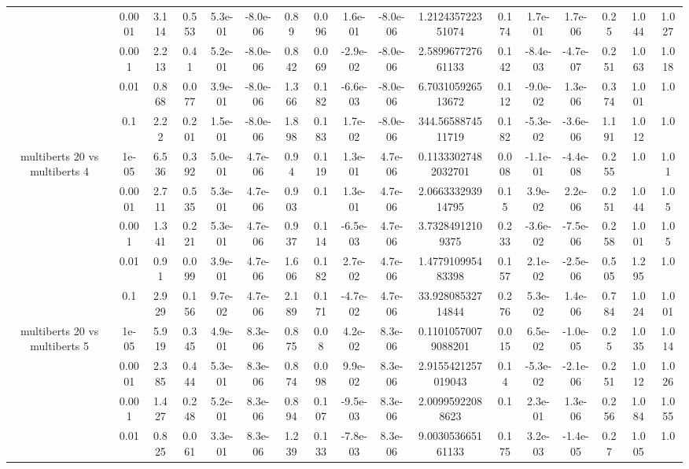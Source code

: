 \begin{tabular}{|c|c|c|c|c|c|c|c|c|c|c|c|c|c|c|c|c|}
 & 0.0001 & 3.114 & 0.553 & 5.3e-01 & -8.0e-06 & 0.89 & 0.096 & 1.6e-01 & -8.0e-06 & 1.212435722351074 & 0.174 & 1.7e-01 & 1.7e-06 & 0.25 & 1.044 & 1.027 \\
 & 0.001 & 2.213 & 0.41 & 5.2e-01 & -8.0e-06 & 0.842 & 0.069 & -2.9e-02 & -8.0e-06 & 2.589967727661133 & 0.142 & -8.4e-03 & -4.7e-07 & 0.251 & 1.063 & 1.018 \\
 & 0.01 & 0.868 & 0.077 & 3.9e-01 & -8.0e-06 & 1.366 & 0.182 & -6.6e-03 & -8.0e-06 & 6.703105926513672 & 0.112 & -9.0e-02 & 1.3e-06 & 0.374 & 1.001 & 1.0 \\
 & 0.1 & 2.22 & 0.201 & 1.5e-01 & -8.0e-06 & 1.898 & 0.183 & 1.7e-02 & -8.0e-06 & 344.5658874511719 & 0.182 & -5.3e-02 & -3.6e-06 & 1.191 & 1.012 & 1.0 \\
\hline
\multirow{5}{*}{multiberts 20 vs multiberts 4} & 1e-05 & 6.536 & 0.392 & 5.0e-01 & 4.7e-06 & 0.94 & 0.119 & 1.3e-01 & 4.7e-06 & 0.11333027482032701 & 0.008 & -1.1e-01 & -4.4e-08 & 0.255 & 1.0 & 1.01 \\
 & 0.0001 & 2.711 & 0.535 & 5.3e-01 & 4.7e-06 & 0.903 & 0.1 & 1.3e-01 & 4.7e-06 & 2.066333293914795 & 0.15 & 3.9e-02 & 2.2e-06 & 0.251 & 1.044 & 1.05 \\
 & 0.001 & 1.341 & 0.221 & 5.3e-01 & 4.7e-06 & 0.937 & 0.114 & -6.5e-03 & 4.7e-06 & 3.73284912109375 & 0.233 & -3.6e-02 & -7.5e-06 & 0.258 & 1.001 & 1.05 \\
 & 0.01 & 0.91 & 0.099 & 3.9e-01 & 4.7e-06 & 1.606 & 0.182 & 2.7e-02 & 4.7e-06 & 1.477910995483398 & 0.157 & 2.1e-02 & -2.5e-06 & 0.505 & 1.295 & 1.0 \\
 & 0.1 & 2.929 & 0.156 & 9.7e-02 & 4.7e-06 & 2.189 & 0.171 & -4.7e-02 & 4.7e-06 & 33.92808532714844 & 0.276 & 5.3e-02 & 1.4e-06 & 0.784 & 1.024 & 1.001 \\
\hline
\multirow{5}{*}{multiberts 20 vs multiberts 5} & 1e-05 & 5.919 & 0.345 & 4.9e-01 & 8.3e-06 & 0.875 & 0.08 & 4.2e-02 & 8.3e-06 & 0.11010570079088201 & 0.015 & 6.5e-02 & -1.0e-05 & 0.25 & 1.035 & 1.014 \\
 & 0.0001 & 2.385 & 0.444 & 5.3e-01 & 8.3e-06 & 0.874 & 0.098 & 9.9e-02 & 8.3e-06 & 2.9155421257019043 & 0.14 & -5.3e-02 & -2.1e-06 & 0.251 & 1.012 & 1.026 \\
 & 0.001 & 1.427 & 0.248 & 5.2e-01 & 8.3e-06 & 0.894 & 0.107 & -9.5e-03 & 8.3e-06 & 2.00995922088623 & 0.1 & 2.3e-01 & 1.3e-06 & 0.256 & 1.084 & 1.055 \\
 & 0.01 & 0.825 & 0.061 & 3.3e-01 & 8.3e-06 & 1.239 & 0.133 & -7.8e-03 & 8.3e-06 & 9.003053665161133 & 0.175 & 3.2e-03 & -1.4e-05 & 0.27 & 1.005 & 1.0 \\

\end{tabular}
